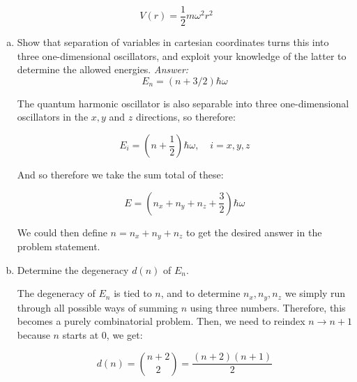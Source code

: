 \documentclass[10pt]{article}
\begin{document}
    \[ V(r) = \frac{1}{2} m\omega^2r^2\] 

    \begin{enumerate}[(a)]
        \item Show that separation of variables in cartesian coordinates turns this into three one-dimensional oscillators, and exploit your knowledge of the latter to determine the allowed energies. \textit{Answer:}
        \[ E_n = (n+ 3/2)\hbar \omega\]

        \begin{solution}
            The quantum harmonic oscillator is also separable into three one-dimensional oscillators in the $x, y$ and $z$ directions, so therefore: 

            \[ E_i = \left(n + \frac 12\right) \hbar \omega, \phantom{aa} i = x, y, z\]

            And so therefore we take the sum total of these: 

            \[ E = (n_x+ n_y + n_z + \frac 32) \hbar \omega\]

            We could then define $n = n_x + n_y + n_z$ to get the desired answer in the problem statement.
        \end{solution}
        \item Determine the degeneracy $d(n)$ of $E_n$.
        
        \begin{solution}
            The degeneracy of $E_n$ is tied to $n$, and to determine $n_x, n_y, n_z$ we simply run through all possible ways of summing $n$ using three numbers. Therefore, this becomes a purely combinatorial problem. Then, we need to reindex $n \to n+1$ because $n$ starts at 0, we get: 

            \[ d(n) = {n+2 \choose 2} = \frac{(n+2)(n+1)}{2}\]
        \end{solution}
    \end{enumerate}
\end{document}
